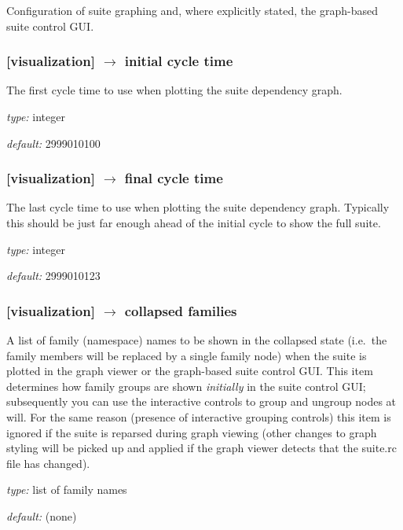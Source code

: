 Configuration of suite graphing and, where explicitly stated, the
graph-based suite control GUI.

\subsubsection[initial cycle time]{[visualization] $\rightarrow$ initial cycle time}

The first cycle time to use when plotting the suite dependency graph.
\begin{myitemize}
    \item {\em type:} integer
    \item {\em default:} 2999010100
\end{myitemize}

\subsubsection[final cycle time]{[visualization] $\rightarrow$ final cycle time}

The last cycle time to use when plotting the suite dependency graph.
Typically this should be just far enough ahead of the initial cycle to
show the full suite.

\begin{myitemize}
    \item {\em type:} integer
    \item {\em default:} 2999010123
\end{myitemize}

\subsubsection[collapsed families]{[visualization] $\rightarrow$ collapsed families}

A list of family (namespace) names to be shown in the collapsed state
(i.e.\ the family members will be replaced by a single family node) when
the suite is plotted in the graph viewer or the graph-based suite
control GUI. This item determines how family groups are shown 
{\em initially} in the suite control GUI; subsequently you can use the
interactive controls to group and ungroup nodes at will. For the same
reason (presence of interactive grouping controls) this item is ignored
if the suite is reparsed during graph viewing (other changes to graph
styling will be picked up and applied if the graph viewer detects that
the suite.rc file has changed). 

\begin{myitemize}
    \item {\em type:} list of family names
    \item {\em default:} (none)
\end{myitemize}

